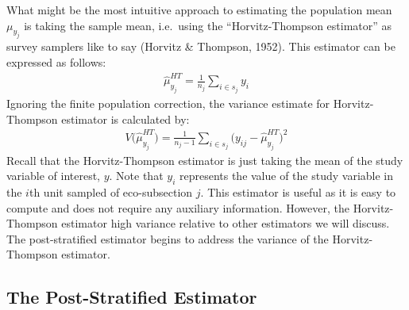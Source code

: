 \documentclass[12pt,twoside]{reedthesis}
\begin{document}
What might be the most intuitive approach to estimating the population mean \(\mu_{y_j}\) is taking the sample mean, i.e.~using the ``Horvitz-Thompson estimator'' as survey samplers like to say (Horvitz \& Thompson, 1952). This estimator can be expressed as follows:
\begin{align}
\hat\mu_{y_j}^{HT} = \frac{1}{n_j} \sum_{i \in s_j} y_i
\end{align}
Ignoring the finite population correction, the variance estimate for Horvitz-Thompson estimator is calculated by:
\begin{align}
V\Big(\hat\mu_{y_j}^{HT}\Big) = \frac{1}{n_j-1} \sum_{i \in s_j} \Big(y_{ij} - \hat\mu_{y_j}^{HT}\Big)^2
\end{align}
Recall that the Horvitz-Thompson estimator is just taking the mean of the study variable of interest, \(y\). Note that \(y_i\) represents the value of the study variable in the \(i\)th unit sampled of eco-subsection \(j\). This estimator is useful as it is easy to compute and does not require any auxiliary information. However, the Horvitz-Thompson estimator high variance relative to other estimators we will discuss. The post-stratified estimator begins to address the variance of the Horvitz-Thompson estimator.

\hypertarget{the-post-stratified-estimator}{%
\subsection{The Post-Stratified Estimator}\label{the-post-stratified-estimator}}
\end{document}

